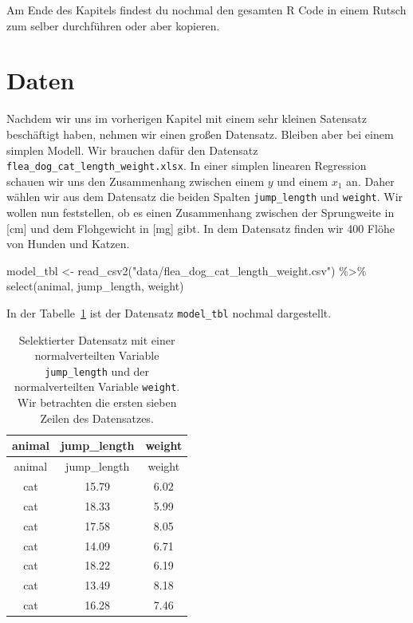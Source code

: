\documentclass[
  letterpaper,
]{scrbook}
\newenvironment{Shaded}{\begin{snugshade}}{\end{snugshade}}
\newcommand{\FunctionTok}[1]{\textcolor[rgb]{0.28,0.35,0.67}{#1}}
\newcommand{\NormalTok}[1]{\textcolor[rgb]{0.00,0.23,0.31}{#1}}
\newcommand{\OtherTok}[1]{\textcolor[rgb]{0.00,0.23,0.31}{#1}}
\newcommand{\SpecialCharTok}[1]{\textcolor[rgb]{0.37,0.37,0.37}{#1}}
\newcommand{\StringTok}[1]{\textcolor[rgb]{0.13,0.47,0.30}{#1}}
\begin{document}
Am Ende des Kapitels findest du nochmal den gesamten R Code in einem
Rutsch zum selber durchführen oder aber kopieren.

\hypertarget{daten-6}{%
\section{Daten}\label{daten-6}}

Nachdem wir uns im vorherigen Kapitel mit einem sehr kleinen Satensatz
beschäftigt haben, nehmen wir einen großen Datensatz. Bleiben aber bei
einem simplen Modell. Wir brauchen dafür den Datensatz
\texttt{flea\_dog\_cat\_length\_weight.xlsx}. In einer simplen linearen
Regression schauen wir uns den Zusammenhang zwischen einem \(y\) und
einem \(x_1\) an. Daher wählen wir aus dem Datensatz die beiden Spalten
\texttt{jump\_length} und \texttt{weight}. Wir wollen nun feststellen,
ob es einen Zusammenhang zwischen der Sprungweite in {[}cm{]} und dem
Flohgewicht in {[}mg{]} gibt. In dem Datensatz finden wir 400 Flöhe von
Hunden und Katzen.

\begin{Shaded}
\begin{Highlighting}[]
\NormalTok{model\_tbl }\OtherTok{\textless{}{-}} \FunctionTok{read\_csv2}\NormalTok{(}\StringTok{"data/flea\_dog\_cat\_length\_weight.csv"}\NormalTok{) }\SpecialCharTok{\%\textgreater{}\%}
  \FunctionTok{select}\NormalTok{(animal, jump\_length, weight)}
\end{Highlighting}
\end{Shaded}

In der Tabelle~\ref{tbl-model-1} ist der Datensatz \texttt{model\_tbl}
nochmal dargestellt.

\hypertarget{tbl-model-1}{}
\begin{longtable}[]{@{}ccc@{}}
\caption{\label{tbl-model-1}Selektierter Datensatz mit einer
normalverteilten Variable \texttt{jump\_length} und der normalverteilten
Variable \texttt{weight}. Wir betrachten die ersten sieben Zeilen des
Datensatzes.}\tabularnewline
\toprule()
animal & jump\_length & weight \\
\midrule()
\endfirsthead
\toprule()
animal & jump\_length & weight \\
\midrule()
\endhead
cat & 15.79 & 6.02 \\
cat & 18.33 & 5.99 \\
cat & 17.58 & 8.05 \\
cat & 14.09 & 6.71 \\
cat & 18.22 & 6.19 \\
cat & 13.49 & 8.18 \\
cat & 16.28 & 7.46 \\
\bottomrule()
\end{longtable}
\end{document}
